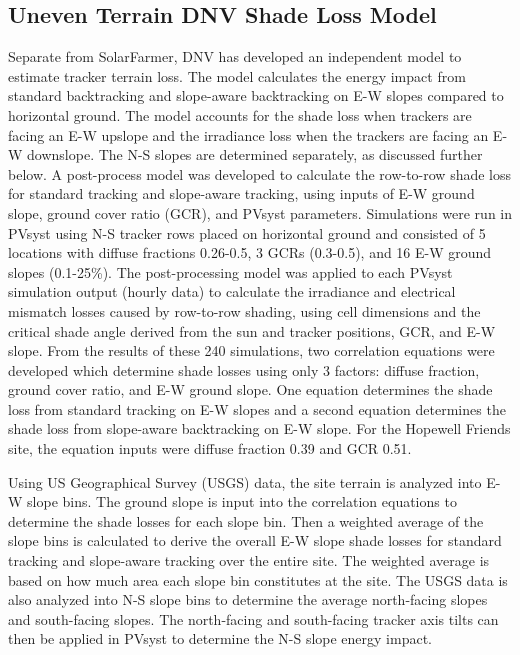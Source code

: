 \documentclass[conference]{IEEEtran}
\begin{document}
\subsection{Uneven Terrain DNV Shade Loss Model}
Separate from SolarFarmer, DNV has developed an independent model to estimate tracker terrain loss. The model calculates the energy impact from standard backtracking and slope-aware backtracking on E-W slopes compared to horizontal ground. The model accounts for the shade loss when trackers are facing an E-W upslope and the irradiance loss when the trackers are facing an E-W downslope. The N-S slopes are determined separately, as discussed further below. A post-process model was developed to calculate the row-to-row shade loss for standard tracking and slope-aware tracking, using inputs of E-W ground slope, ground cover ratio (GCR), and PVsyst parameters. Simulations were run in PVsyst using N-S tracker rows placed on horizontal ground and consisted of 5 locations with diffuse fractions 0.26-0.5, 3 GCRs (0.3-0.5), and 16 E-W ground slopes (0.1-25\%). The post-processing model was applied to each PVsyst simulation output (hourly data) to calculate the irradiance and electrical mismatch losses caused by row-to-row shading, using cell dimensions and the critical shade angle derived from the sun and tracker positions, GCR, and E-W slope. From the results of these 240 simulations, two correlation equations were developed which determine shade losses using only 3 factors: diffuse fraction, ground cover ratio, and E-W ground slope. One equation determines the shade loss from standard tracking on E-W slopes and a second equation determines the shade loss from slope-aware backtracking on E-W slope. For the Hopewell Friends site, the equation inputs were diffuse fraction 0.39 and GCR 0.51.

Using US Geographical Survey (USGS) data, the site terrain is analyzed into E-W slope bins. The ground slope is input into the correlation equations to determine the shade losses for each slope bin. Then a weighted average of the slope bins is calculated to derive the overall E-W slope shade losses for standard tracking and slope-aware tracking over the entire site. The weighted average is based on how much area each slope bin constitutes at the site. The USGS data is also analyzed into N-S slope bins to determine the average north-facing slopes and south-facing slopes. The north-facing and south-facing tracker axis tilts can then be applied in PVsyst to determine the N-S slope energy impact.
\end{document}
